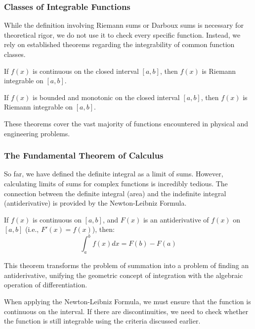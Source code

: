 \documentclass[oneside]{book}
\begin{document}
\subsubsection{Classes of Integrable Functions}

While the definition involving Riemann sums or Darboux sums is necessary for theoretical rigor, we do not use it to check every specific function. Instead, we rely on established theorems regarding the integrability of common function classes.

\begin{theorem}
If $f(x)$ is continuous on the closed interval $[a,b]$, then $f(x)$ is Riemann integrable on $[a,b]$.
\end{theorem}

\begin{theorem}
If $f(x)$ is bounded and monotonic on the closed interval $[a,b]$, then $f(x)$ is Riemann integrable on $[a,b]$.
\end{theorem}

These theorems cover the vast majority of functions encountered in physical and engineering problems.

\subsubsection{The Fundamental Theorem of Calculus}

So far, we have defined the definite integral as a limit of sums. However, calculating limits of sums for complex functions is incredibly tedious. The connection between the definite integral (area) and the indefinite integral (antiderivative) is provided by the Newton-Leibniz Formula.

\begin{theorem}
If $f(x)$ is continuous on $[a,b]$, and $F(x)$ is an antiderivative of $f(x)$ on $[a,b]$ (i.e., $F'(x) = f(x)$), then:
\[
\int_a^b f(x) dx = F(b) - F(a)
\]
\end{theorem}

This theorem transforms the problem of summation into a problem of finding an antiderivative, unifying the geometric concept of integration with the algebraic operation of differentiation.

When applying the Newton-Leibniz Formula, we must ensure that the function is continuous on the interval. If there are discontinuities, we need to check whether the function is still integrable using the criteria discussed earlier.
\end{document}
